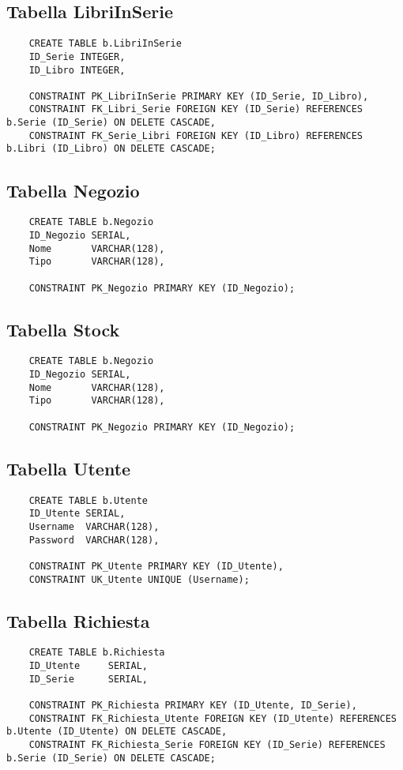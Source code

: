 \newpage

\subsection{Tabella LibriInSerie}
\begin{lstlisting}
    CREATE TABLE b.LibriInSerie
    ID_Serie INTEGER,
    ID_Libro INTEGER,

    CONSTRAINT PK_LibriInSerie PRIMARY KEY (ID_Serie, ID_Libro),
    CONSTRAINT FK_Libri_Serie FOREIGN KEY (ID_Serie) REFERENCES b.Serie (ID_Serie) ON DELETE CASCADE,
    CONSTRAINT FK_Serie_Libri FOREIGN KEY (ID_Libro) REFERENCES b.Libri (ID_Libro) ON DELETE CASCADE;
\end{lstlisting}

\subsection{Tabella Negozio}
\begin{lstlisting}
    CREATE TABLE b.Negozio
    ID_Negozio SERIAL,
    Nome       VARCHAR(128),
    Tipo       VARCHAR(128),

    CONSTRAINT PK_Negozio PRIMARY KEY (ID_Negozio);
\end{lstlisting}

\subsection{Tabella Stock}
\begin{lstlisting}
    CREATE TABLE b.Negozio
    ID_Negozio SERIAL,
    Nome       VARCHAR(128),
    Tipo       VARCHAR(128),

    CONSTRAINT PK_Negozio PRIMARY KEY (ID_Negozio);
\end{lstlisting}

\subsection{Tabella Utente}
\begin{lstlisting}
    CREATE TABLE b.Utente
    ID_Utente SERIAL,
    Username  VARCHAR(128),
    Password  VARCHAR(128),

    CONSTRAINT PK_Utente PRIMARY KEY (ID_Utente),
    CONSTRAINT UK_Utente UNIQUE (Username);
\end{lstlisting}

\newpage

\subsection{Tabella Richiesta}
\begin{lstlisting}
    CREATE TABLE b.Richiesta
    ID_Utente     SERIAL,
    ID_Serie      SERIAL,

    CONSTRAINT PK_Richiesta PRIMARY KEY (ID_Utente, ID_Serie),
    CONSTRAINT FK_Richiesta_Utente FOREIGN KEY (ID_Utente) REFERENCES b.Utente (ID_Utente) ON DELETE CASCADE,
    CONSTRAINT FK_Richiesta_Serie FOREIGN KEY (ID_Serie) REFERENCES b.Serie (ID_Serie) ON DELETE CASCADE;
\end{lstlisting}

